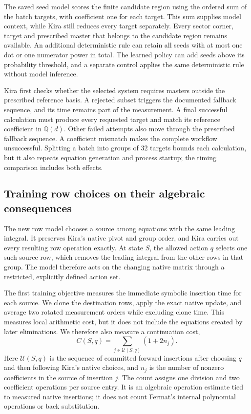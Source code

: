 The saved seed model scores the finite candidate region using the
ordered sum of the batch targets, with coefficient one for each target.
This sum supplies model context, while Kira still reduces every target
separately. Every sector corner, target and prescribed master that
belongs to the candidate region remains available. An additional
deterministic rule can retain all seeds with at most one dot or one
numerator power in total. The learned policy can add seeds above its
probability threshold, and a separate control applies the same
deterministic rule without model inference.

Kira first checks whether the selected system requires masters outside
the prescribed reference basis. A rejected subset triggers the
documented fallback sequence, and its time remains part of the
measurement. A final successful calculation must produce every
requested target and match its reference coefficient in $\mathbb Q(d)$.
Other failed attempts also move through the prescribed fallback sequence. A coefficient mismatch makes the complete workflow unsuccessful. Splitting a batch into groups of
32 targets bounds each calculation, but it also repeats equation
generation and process startup; the timing comparison includes both
effects.

\subsection{Training row choices on their algebraic consequences}
The new row model chooses a source among equations with the same
leading integral. It preserves Kira's native pivot and group order, and
Kira carries out every resulting row operation exactly. At state $S$,
the allowed action $q$ selects one such source row, which removes the
leading integral from the other rows in that group. The model therefore
acts on the changing native matrix through a restricted, explicitly
defined action set.

The first training objective measures the immediate symbolic insertion
time for each source. We clone the destination rows, apply the exact
native update, and average two rotated measurement orders while
excluding clone time. This measures local arithmetic cost, but it does
not include the equations created by later eliminations. We therefore
also measure a continuation cost,
\begin{equation}
 C(S,q)=\sum_{j\in\mathcal U(S,q)}(1+2n_j).
 \label{eq:continuation-cost}
\end{equation}
Here $\mathcal U(S,q)$ is the sequence of committed forward insertions
after choosing $q$ and then following Kira's native choices, and $n_j$
is the number of nonzero coefficients in the source of insertion $j$.
The count assigns one division and two coefficient operations per
source entry. It is an algebraic operation estimate tied to measured
native insertions; it does not count Fermat's internal polynomial
operations or back substitution.


